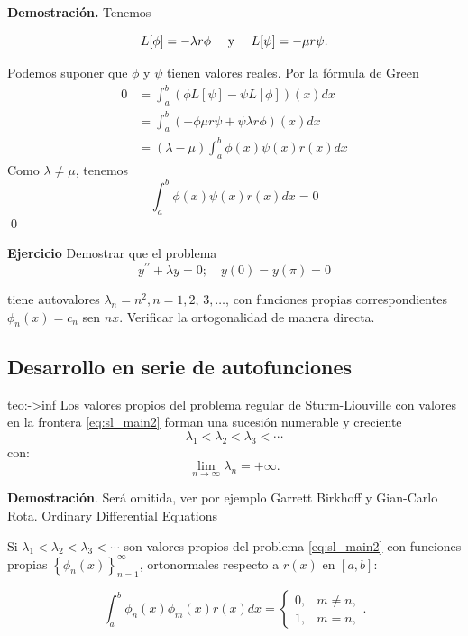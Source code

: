 \textbf{Demostración.} Tenemos

$$L[\phi]=-\lambda r \phi\quad\hbox{ y }\quad L[\psi]=-\mu r \psi.$$

Podemos suponer que $\phi$ y $\psi$ tienen valores reales. Por la fórmula de Green
$$
\begin{aligned}
0 &=\int_{a}^{b}(\phi L[\psi]-\psi L[\phi])(x) d x \\
&=\int_{a}^{b}(-\phi \mu r \psi+\psi \lambda r \phi)(x) d x \\
&=(\lambda-\mu) \int_{a}^{b} \phi(x) \psi(x) r(x) d x
\end{aligned}
$$
Como $\lambda \neq \mu$, tenemos
$$
\int_{a}^{b} \phi(x) \psi(x) r(x) d x=0
$$
\qed
 

\textbf{Ejercicio} Demostrar que el problema
$$y^{\prime \prime}+\lambda y=0 ; \quad y(0)=y(\pi)=0$$

tiene autovalores  $\lambda_{n}=n^{2}, n=1,2$, $3, \ldots$, con funciones propias correspondientes $\phi_{n}(x)=c_{n}$ sen $n x$. Verificar la ortogonalidad de manera directa.

 
 
 
 \subsection{Desarrollo en serie de autofunciones}
 
 
 

 \begin{teorema}{teo:->inf}{} Los valores propios del problema regular de Sturm-Liouville con valores en la frontera \eqref{eq:sl_main2} forman una sucesión numerable y creciente
$$\lambda_{1}<\lambda_{2}<\lambda_{3}<\cdots$$
con:
$$\lim _{n \rightarrow \infty} \lambda_{n}=+\infty.$$
\end{teorema}



\textbf{Demostración}. Será omitida, ver por ejemplo Garrett Birkhoff y Gian-Carlo Rota. Ordinary Differential Equations

 
 Si $\lambda_{1}<\lambda_{2}<\lambda_{3}<\cdots$ son valores propios del problema \eqref{eq:sl_main2} con funciones propias  $\left\{\phi_{n}(x)\right\}_{n=1}^{\infty}$,  ortonormales respecto  a $r(x)$ en $[a, b]$:

 $$\int_{a}^{b} \phi_{n}(x) \phi_{m}(x) r(x) d x= \begin{cases}0, & m \neq n, \\ 1, & m=n,\end{cases}.$$ 

